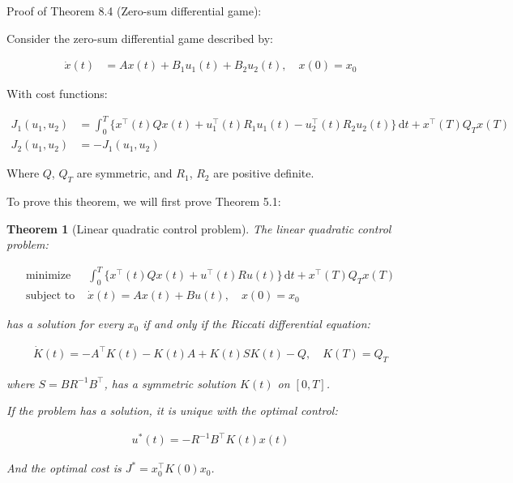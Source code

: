 \documentclass[3p]{elsarticle}
\newtheorem{theorem}{Theorem}
\begin{document}
Proof of Theorem 8.4 (Zero-sum differential game):

Consider the zero-sum differential game described by:

\begin{align*}
\dot{x}(t) &= Ax(t) + B_1u_1(t) + B_2u_2(t), \quad x(0)=x_0
\end{align*}

With cost functions:

\begin{align*}
J_1(u_1,u_2) &= \int_0^T \{x^\top (t)Qx(t) + u_1^\top(t) R_1u_1(t) - u_2^\top(t)R_2u_2(t)\}\,\mathrm{d}t + x^\top(T)Q_Tx(T) \\
J_2(u_1,u_2) &= -J_1(u_1,u_2)
\end{align*}

Where $Q$, $Q_T$ are symmetric, and $R_1$, $R_2$ are positive definite.

To prove this theorem, we will first prove Theorem 5.1:

\begin{theorem}[Linear quadratic control problem]
The linear quadratic control problem:

\begin{align*}
\text{minimize } &\int_0^T\{x^\top(t) Q x(t) + u^\top(t) R u(t)\}\,\mathrm{d}t + x^\top(T)Q_Tx(T) \\
\text{subject to } &\dot{x}(t) = Ax(t) + Bu(t), \quad x(0) = x_0  
\end{align*}

has a solution for every $x_0$ if and only if the Riccati differential equation:

\begin{align*}
\dot{K}(t) = -A^\top K(t) - K(t)A + K(t)SK(t) - Q, \quad K(T) = Q_T  
\end{align*}

where $S=BR^{-1}B^\top$, has a symmetric solution $K(t)$ on $[0,T]$. 

If the problem has a solution, it is unique with the optimal control:

\begin{align*}
u^*(t) = -R^{-1}B^\top K(t) x(t)
\end{align*}

And the optimal cost is $J^* = x_0^\top K(0) x_0$.
\end{theorem}
\end{document}
